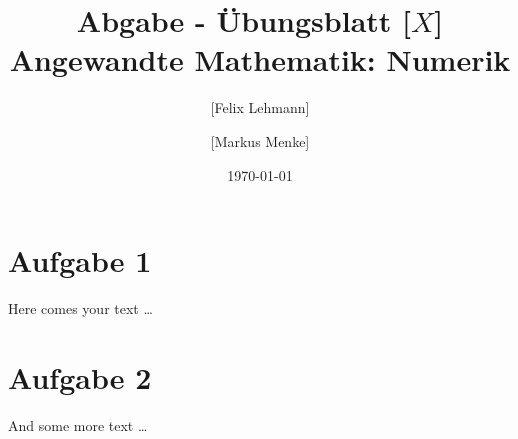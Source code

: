 \documentclass[10pt,a4paper]{article}
\begin{document}
\title{Abgabe - Übungsblatt [$X$]\\
\small{Angewandte Mathematik: Numerik}}
\author{ [Felix Lehmann] \and [Markus Menke]}
\date{\today}
\maketitle

\section*{Aufgabe 1}
Here comes your text \ldots

\section*{Aufgabe 2}
And some more text \ldots
\end{document}
